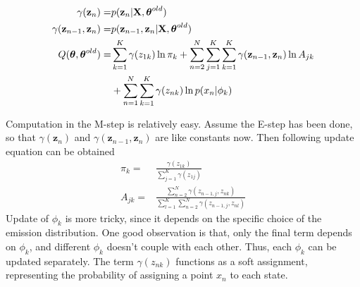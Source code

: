 \begin{align}
	\gamma(\mathbf{z}_n) = &p(\mathbf{z}_n | \mathbf{X}, \boldsymbol{\theta}^{old})	\\
	\gamma(\mathbf{z}_{n-1}, \mathbf{z}_n) = &p(\mathbf{z}_{n-1}, \mathbf{z}_n | \mathbf{X}, \boldsymbol{\theta}^{old}) \\
	Q(\boldsymbol{\theta}, \boldsymbol{\theta}^{old}) = &\sum_{k=1}^{K} \gamma(z_{1k})\ln \pi_k + \sum_{n=2}^{N}\sum_{j=1}^{K}\sum_{k=1}^{K}\gamma(\mathbf{z}_{n-1}, \mathbf{z}_n)\ln A_{jk}		\notag		\\
		&+ \sum_{n=1}^{N}\sum_{k=1}^{K}\gamma(z_{nk})\ln p(x_n|\phi_k)	
\end{align}

Computation in the M-step is relatively easy. Assume the E-step has been done, so that  \(\gamma(\mathbf{z}_n)\) and \(\gamma(\mathbf{z}_{n-1}, \mathbf{z}_n)\) are like constants now. Then following update equation can be obtained
\begin{align}
	\pi_k = & \frac{\gamma(z_{1k})}{\sum_{j=1}^{K}\gamma(z_{1j})}	\\
	A_{jk} = & \frac{\sum_{n=2}^{N}\gamma(z_{n-1,j},z_{nk})}{\sum_{l=1}^{K}\sum_{n=2}^{N}\gamma(z_{n-1,j},z_{nl})}
\end{align}
Update of \(\phi_k\) is more tricky, since it depends on the specific choice of the emission distribution. One good observation is that, only the final term depends on \(\phi_k\), and different \(\phi_k\) doesn't couple with each other. Thus, each \(\phi_k\) can be updated separately. The term \(\gamma(z_{nk})\) functions as a soft assignment, representing the probability of assigning a point \(x_n\) to each state.

